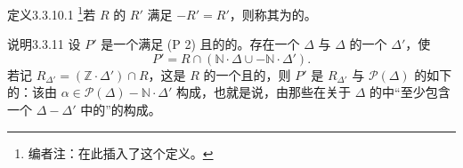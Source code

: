 \begin{SGAresult}{定义}{3.3.10.1}
\footnote{编者注：在此插入了这个定义。}若 $R$ 的 $R'$ 满足 $-R'=R'$，则称其为的。
\end{SGAresult}

\begin{SGAresult}{说明}{3.3.11}
设 $P'$ 是一个满足 (P 2) 且的的。存在一个 $\Delta$ 与 $\Delta$ 的一个 $\Delta'$，使
\[P'=R\cap(\mathbb N\cdot\Delta\cup-\mathbb N\cdot\Delta').\]
若记 $R_{\Delta'}=(\mathbb Z\cdot\Delta')\cap R$，这是 $R$ 的一个且的，则 $P'$ 是 $R_{\Delta'}$ 与 $\mathscr P(\Delta)$ 的如下的：该由 $\alpha\in\mathscr P(\Delta)-\mathbb N\cdot\Delta'$ 构成，也就是说，由那些在关于 $\Delta$ 的中“至少包含一个 $\Delta-\Delta'$ 中的”的构成。
\end{SGAresult}

